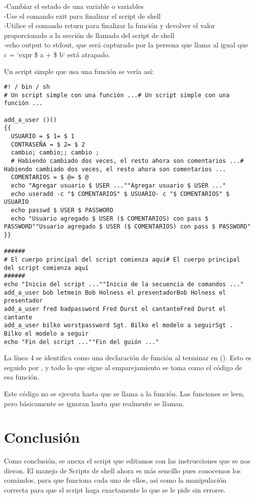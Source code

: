 \documentclass[12pt]{article}
\begin{document}
-Cambiar el estado de una variable o variables\\-Use el comando exit para finalizar el script de shell\\-Utilice el comando return para finalizar la función y devolver el valor proporcionado a la sección de llamada del script de shell\\-echo output to stdout, que será capturado por la persona que llama al igual que c = `expr \$ a + \$ b` está atrapado.

Un script simple que usa una función se vería así:

\begin{verbatim}
#! / bin / sh
# Un script simple con una función ...# Un script simple con una función ...

add_a_user ()()
{{
  USUARIO = $ 1= $ 1
  CONTRASEÑA = $ 2= $ 2
  cambio; cambio;; cambio ;
  # Habiendo cambiado dos veces, el resto ahora son comentarios ...# Habiendo cambiado dos veces, el resto ahora son comentarios ...
  COMENTARIOS = $ @= $ @
  echo "Agregar usuario $ USER ...""Agregar usuario $ USER ..."
  echo useradd -c "$ COMENTARIOS" $ USUARIO- c "$ COMENTARIOS" $ USUARIO
  echo passwd $ USER $ PASSWORD
  echo "Usuario agregado $ USER ($ COMENTARIOS) con pass $ PASSWORD""Usuario agregado $ USER ($ COMENTARIOS) con pass $ PASSWORD"
}}

######
# El cuerpo principal del script comienza aquí# El cuerpo principal del script comienza aquí
######
echo "Inicio del script ...""Inicio de la secuencia de comandos ..."
add_a_user bob letmein Bob Holness el presentadorBob Holness el presentador
add_a_user fred badpassword Fred Durst el cantanteFred Durst el cantante
add_a_user bilko worstpassword Sgt. Bilko el modelo a seguirSgt . Bilko el modelo a seguir
echo "Fin del script ...""Fin del guión ..."
\end{verbatim}

La línea 4 se identifica como una declaración de función al terminar en (). Esto es seguido por {, y todo lo que sigue al emparejamiento }se toma como el código de esa función.

Este código no se ejecuta hasta que se llama a la función. Las funciones se leen, pero básicamente se ignoran hasta que realmente se llaman.

\section{Conclusión}

Como conclusión, se anexa el script que editamos con las instrucciones que se nos dieron. El manejo de Scripts de shell ahora es más sencillo pues conocemos los comándos, para que funciona cada uno de ellos, así como la manipulación correcta para que el script haga exactamente lo que se le pide sin errores.
\end{document}
